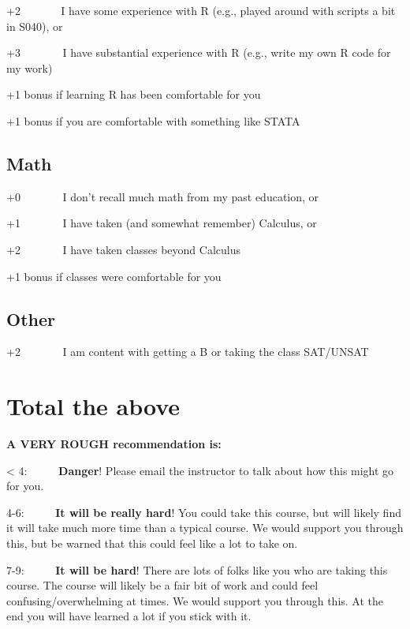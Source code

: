 \documentclass[
  letterpaper,
  DIV=11,
  numbers=noendperiod]{scrreprt}
\begin{document}
+2 ~~~~~~ I have some experience with R (e.g., played around with
scripts a bit in S040), or

+3~~~~~~~ I have substantial experience with R (e.g., write my own R
code for my work)

+1 bonus if learning R has been comfortable for you

+1 bonus if you are comfortable with something like STATA

\hypertarget{math}{%
\subsection*{\texorpdfstring{\textbf{Math}}{Math}}\label{math}}

+0~~~~~~~ I don't recall much math from my past education, or

+1~~~~~~~ I have taken (and somewhat remember) Calculus, or

+2~~~~~~~ I have taken classes beyond Calculus

+1 bonus if classes were comfortable for you

\hypertarget{other}{%
\subsection*{\texorpdfstring{\textbf{Other}}{Other}}\label{other}}

+2~~~~~~~ I am content with getting a B or taking the class SAT/UNSAT

\hypertarget{total-the-above}{%
\section*{Total the above}\label{total-the-above}}


\textbf{A VERY ROUGH recommendation is:}

\textless{} 4:~~~~~ \textbf{Danger}! Please email the instructor to talk
about how this might go for you.

4-6:~~~~~ \textbf{It will be really hard}! You could take this course,
but will likely find it will take much more time than a typical course.
We would support you through this, but be warned that this could feel
like a lot to take on.

7-9:~~~~~ \textbf{It will be hard}! There are lots of folks like you who
are taking this course. The course will likely be a fair bit of work and
could feel confusing/overwhelming at times. We would support you through
this. At the end you will have learned a lot if you stick with it.
\end{document}
